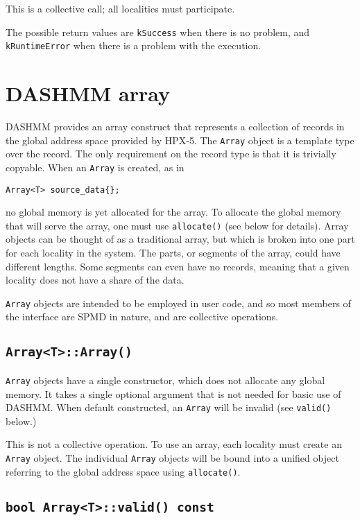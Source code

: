 \documentclass[11pt]{book}
\begin{document}
This is a collective call; all localities must participate.

The possible return values are {\tt kSuccess} when there is no problem, and
{\tt kRuntimeError} when there is a problem with the execution.

\section{DASHMM array} 
DASHMM provides an array construct that represents a collection of records in
the global address space provided by HPX-5. The {\tt Array} object is a template
type over the record. The only requirement on the record type is that it is
trivially copyable. When an {\tt Array} is created, as in

\begin{verbatim}
Array<T> source_data{};
\end{verbatim}

no global memory is yet allocated for the array. To allocate the global memory
that will serve the array, one must use {\tt allocate()} (see below for
details). Array objects can be thought of as a traditional array, but which is
broken into one part for each locality in the system. The parts, or segments of
the array, could have different lengths. Some segments can even have no records,
meaning that a given locality does not have a share of the data.

{\tt Array} objects are intended to be employed in user code, and so most
members of the interface are SPMD in nature, and are collective operations.

\subsection{{\tt Array<T>::Array()}}

{\tt Array} objects have a single constructor, which does not allocate any
global memory. It takes a single optional argument that is not needed for basic
use of DASHMM. When default constructed, an {\tt Array} will be invalid (see
{\tt valid()} below.)

This is not a collective operation. To use an array, each locality must create
an {\tt Array} object. The individual {\tt Array} objects will be bound into a
unified object referring to the global address space using {\tt allocate()}.

\subsection{{\tt bool Array<T>::valid() const}}
\end{document}
